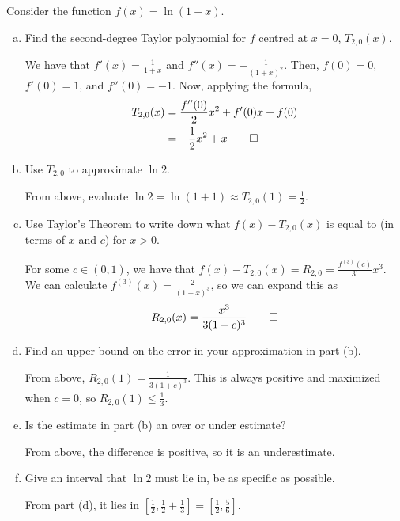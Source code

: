 \documentclass{agony}
\begin{document}
\begin{prob} Consider the function $f(x) = \ln(1+x)$.
  \begin{enumerate}[(a)]
    \item Find the second-degree Taylor polynomial for $f$ centred at $x=0$, $T_{2,0}(x)$.
          \begin{sol}
            We have that $f'(x) = \frac{1}{1+x}$ and $f''(x) = -\frac{1}{(1+x)^2}$.
            Then, $f(0) = 0$, $f'(0) = 1$, and $f''(0) = -1$.
            Now, applying the formula,
            \begin{align*}
              T_{2,0}(x) & = \frac{f''(0)}{2}x^2 + f'(0)x + f(0) \\
                         & = -\frac{1}{2}x^2 + x \qedhere
            \end{align*}
          \end{sol}
    \item Use $T_{2,0}$ to approximate $\ln 2$.
          \begin{sol}
            From above, evaluate $\ln 2 = \ln(1+1) \approx T_{2,0}(1) = \frac12$.
          \end{sol}
    \item Use Taylor's Theorem to write down what $f(x) - T_{2,0}(x)$ is equal to
          (in terms of $x$ and $c$) for $x > 0$.
          \begin{sol}
            For some $c\in(0,1)$, we have that $f(x) - T_{2,0}(x) = R_{2,0} = \frac{f^{(3)}(c)}{3!}x^3$.
            We can calculate $f^{(3)}(x) = \frac{2}{(1+x)^3}$, so we can expand this as
            \[ R_{2,0}(x) = \frac{x^3}{3(1+c)^3} \qedhere \]
          \end{sol}
    \item Find an upper bound on the error in your approximation in part (b).
          \begin{sol}
            From above, $R_{2,0}(1) = \frac{1}{3(1+c)^3}$.
            This is always positive and maximized when $c=0$, so $R_{2,0}(1) \leq \frac{1}{3}$.
          \end{sol}
    \item Is the estimate in part (b) an over or under estimate?
          \begin{sol}
            From above, the difference is positive, so it is an underestimate.
          \end{sol}
    \item Give an interval that $\ln 2$ must lie in, be as specific as possible.
          \begin{sol}
            From part (d), it lies in $[\frac12,\frac12+\frac13] = [\frac12,\frac56]$.
          \end{sol}
  \end{enumerate}
\end{prob}
\end{document}
